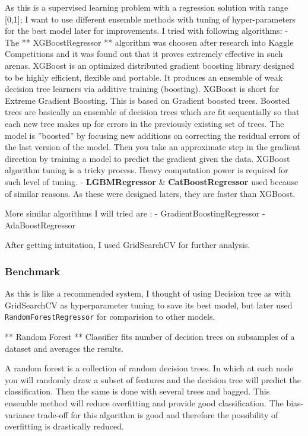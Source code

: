 \documentclass[11pt]{article}
\begin{document}
    As this is a supervised learning problem with a regression solution with
range {[}0,1{]}; I want to use different ensemble methods with tuning of
hyper-parameters for the best model later for improvements. I tried with
following algorithms: - The ** XGBoostRegressor ** algorithm was choosen
after research into Kaggle Competitions and it was found out that it
proves extremely effective in such arenas. XGBoost is an optimized
distributed gradient boosting library designed to be highly efficient,
flexible and portable. It produces an ensemble of weak decision tree
learners via additive training (boosting). XGBoost is short for Extreme
Gradient Boosting. This is based on Gradient boosted trees. Boosted
trees are basically an ensemble of decision trees which are fit
sequentially so that each new tree makes up for errors in the previously
existing set of trees. The model is ''boosted'' by focusing new
additions on correcting the residual errors of the last version of the
model. Then you take an approximate step in the gradient direction by
training a model to predict the gradient given the data. XGBoost
algorithm tuning is a tricky process. Heavy computation power is
required for such level of tuning. - \textbf{LGBMRegressor} \&
\textbf{CatBoostRegressor} used because of similar reasons. As these
were designed laters, they are faster than XGBoost.

More similar algorithms I will tried are : - GradientBoostingRegressor -
AdaBoostRegressor

After getting intuitation, I used GridSearchCV for further analysis.

    \hypertarget{benchmark}{%
\subsubsection{Benchmark}\label{benchmark}}

    As this is like a recommended system, I thought of using Decision tree
as with GridSearchCV as hyperparameter tuning to save its best model,
but later used \texttt{RandomForestRegressor} for comparision to other
models.

** Random Forest ** Classifier fits number of decision trees on
subsamples of a dataset and averages the results.

A random forest is a collection of random decision trees. In which at
each node you will randomly draw a subset of features and the decision
tree will predict the classification. Then the same is done with several
trees and bagged. This ensemble method will reduce overfitting and
provide good classification. The bias-variance trade-off for this
algorithm is good and therefore the possibility of overfitting is
drastically reduced.
\end{document}
